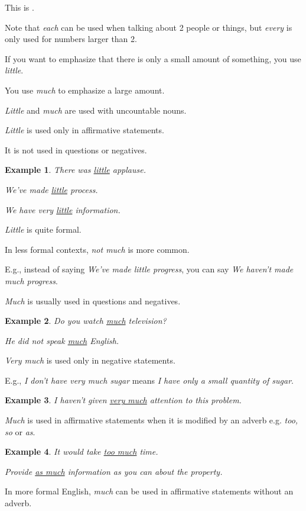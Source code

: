\documentclass[oneside]{book}
\numberwithin{equation}{section}
\newtheorem{example}{Example}[section]
\begin{document}
This is .

%
Note that \textit{each} can be used when talking about 2 people or things, but \textit{every} is only used for numbers larger than 2.

%
\noindent{} If you want to emphasize that there is only a small amount of something, you use \textit{little}.

You use \textit{much} to emphasize a large amount.

\textit{Little} and \textit{much} are used with uncountable nouns.

%
\textit{Little} is used only in affirmative statements.

It is not used in questions or negatives.
\begin{example}
    There was \underline{little} applause.
    
    We've made \underline{little} process.
    
    We have very \underline{little} information.
\end{example}
\textit{Little} is quite formal.

In less formal contexts, \textit{not much} is more common.

E.g., instead of saying \textit{We've made little progress}, you can say \textit{We haven't made much progress}.

%
\textit{Much} is usually used in questions and negatives.
\begin{example}
    Do you watch \underline{much} television?
    
    He did not speak \underline{much} English.
\end{example}
\textit{Very much} is used only in negative statements.

E.g., \textit{I don't have very much sugar} means \textit{I have only a small quantity of sugar}.
\begin{example}
    I haven't given \underline{very much} attention to this problem.
\end{example}
\textit{Much} is used in affirmative statements when it is modified by an adverb e.g. \textit{too, so} or \textit{as}.
\begin{example}
    It would take \underline{too much} time.
    
    Provide \underline{as much} information as you can about the property.
\end{example}
In more formal English, \textit{much} can be used in affirmative statements without an adverb.
\end{document}

